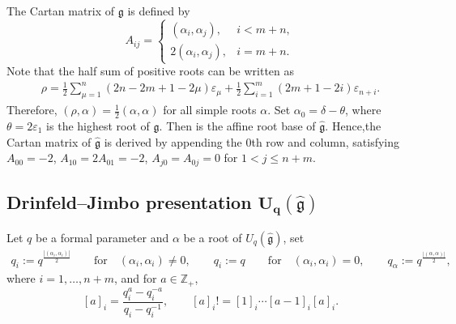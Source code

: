 \documentclass[pdftex]{sigma}
\numberwithin{equation}{section}
\begin{document}
The Cartan matrix  of $\mathfrak{g}$ is defined by
\begin{equation*}
 A_{ij}=
 \begin{cases}
 (\alpha_i, \alpha_j), &i<m+n,\\
 2(\alpha_i, \alpha_j), &i=m+n.
 \end{cases}
\end{equation*}
Note that
the half sum of positive roots can be written as
\begin{align*}
 \rho=\frac{1}{2}\sum\limits_{\mu=1}^{n}(2n-2m+1-2\mu)\varepsilon_\mu+\frac{1}{2}\sum\limits_{i=1}^{m}(2m+1-2i)\varepsilon_{n+i}.
\end{align*}
Therefore, $(\rho,\alpha)=\frac{1}{2}(\alpha,\alpha)$ for all simple roots $\alpha$.
Set $\alpha_0=\delta-\theta$, where $\theta=2\varepsilon_1$ is the highest root of $\mathfrak{g}$. Then
 is the affine root base of $\mathfrak{\hat{g}}$. Hence,the Cartan matrix  of $\mathfrak{\hat{g}}$ is derived by appending the 0th row and column, satisfying $A_{00}=-2$, $ A_{10}=2A_{01}=-2$, $ A_{j0}=A_{0j}=0$ for $1<j\leqslant n+m$.


\subsection[Drinfeld--Jimbo presentation U\_q(g)]{Drinfeld--Jimbo presentation $\boldsymbol{U_q(\mathfrak{\hat{g}})}$}

Let $q$ be a formal parameter and $\alpha$ be a root of $U_q(\mathfrak{\hat{g}})$, set
\begin{gather*}
 q_i := q^{\frac{|(\alpha_i, \alpha_i)|}{2}}\qquad \textrm{for}\quad(\alpha_i, \alpha_i)\neq0, \qquad q_i := q\qquad\textrm{for}\quad(\alpha_i, \alpha_i)=0,\qquad
 q_\alpha := q^{\frac{|(\alpha, \alpha)|}{2}},
\end{gather*}
where $i=1,\dots,n+m$, and for $ a \in \mathbb{Z}_+$,
\[
 [a]_i = \frac{q_i^a - q_i^{-a}}{q_i - q_i^{-1}}, \qquad [a]_i! = [1]_i \cdots [a-1]_i [a]_i.
 \]
\end{document}
